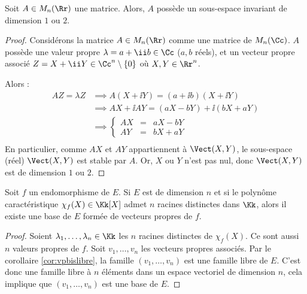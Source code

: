 \documentclass[12pt, class=report,crop=false]{standalone}
\begin{document}
\begin{exemple}
Soit $A \in M_n(\Rr)$ une matrice.
Alors, $A$ possède un sous-espace invariant de dimension $1$ ou $2$.

\begin{proof}
Considérons la matrice $A \in M_n(\Rr)$ comme une matrice de ${M}_n(\Cc)$.
 $A$ possède une valeur propre $\lambda = a+\ii b \in \Cc$ ($a,b$ réels), et un  vecteur propre associé 
 $Z=X+\ii Y \in \Cc^n \setminus\{0\}$ 
où $X,Y \in \Rr^n$. 

Alors :
\begin{align*}
A Z  = \lambda Z 
  &\implies A(X+\ii Y) = (a+\ii b)(X+\ii Y) \\
  &\implies AX + \ii AY = (aX -bY) + \ii (bX+aY) \\
  &\implies \left\{\begin{array}{rcl} AX &=& aX-bY \\ AY &=& bX +a Y \end{array}\right. \\
\end{align*}
En particulier, comme $AX$ et $AY$ appartiennent à $\Vect(X,Y)$, le sous-espace (réel) $\Vect(X,Y)$ est stable par $A$. 
Or, $X$ ou $Y$ n'est pas nul, donc $\Vect(X, Y)$ est de dimension $1$ ou $2$. 
\end{proof}
\end{exemple}


\begin{exemple}
Soit $f$ un endomorphisme de $E$. Si $E$ est de dimension $n$ et si le polynôme caractéristique 
$\chi_f(X) \in \Kk[X]$ admet $n$ racines distinctes dans $\Kk$, alors il existe une base 
de $E$ formée de vecteurs propres de $f$.

\begin{proof}
Soient $\lambda_1,\ldots,\lambda_n \in \Kk$ les $n$ racines distinctes de $\chi_f(X)$. 
Ce sont aussi $n$ valeurs propres de $f$. 
Soit $v_1,\ldots,v_n$ les vecteurs propres associés.
Par le corollaire \ref{cor:vpbislibre}, la famille $(v_1,\ldots,v_n)$ est une famille libre de $E$.
C'est donc une famille libre à $n$ éléments dans un espace vectoriel de dimension $n$, cela implique
que $(v_1,\ldots,v_n)$ est une base de $E$.
\end{proof}

\end{exemple}
\end{document}
